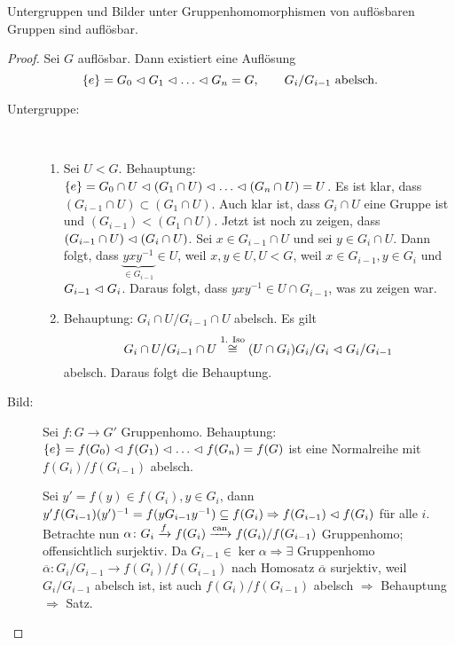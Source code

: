 \documentclass[12pt,a4paper]{scrartcl}
\begin{document}
	\begin{satz}
		Untergruppen und Bilder unter Gruppenhomomorphismen von auflösbaren Gruppen sind auflösbar.
	\end{satz}
	\begin{proof}
		Sei $G$ auflösbar. Dann existiert eine Auflösung 
		\begin{equation*}
			\left\lbrace e\right\rbrace = G_0 \vartriangleleft G_1 \vartriangleleft \ldots \vartriangleleft G_n = G, \qquad  G_i/G_{i-1} \text{ abelsch.}
		\end{equation*}
		\begin{description}
			\item[Untergruppe:]~
				\begin{enumerate}
					\item Sei $U < G$. Behauptung: $\left\lbrace e\right\rbrace = G_0 \cap U \vartriangleleft (G_1 \cap U) \vartriangleleft \ldots \vartriangleleft (G_n \cap U) = U $. Es ist klar, dass $(G_{i-1} \cap U) \subset (G_1 \cap U)$. Auch klar ist, dass $G_i \cap U$ eine Gruppe ist und $(G_{i-1} ) < (G_1 \cap U)$. Jetzt ist noch zu zeigen, dass $(G_{i-1} \cap U) \vartriangleleft (G_i \cap U)$. Sei $x \in G_{i-1} \cap U$ und sei $y \in G_i \cap U$. Dann folgt, dass $\underbrace{yxy^{-1}}_{\in G_{i-1}} \in U$, weil $x, y \in U, U < G$, weil $x \in G_{i-1}, y \in G_i$ und $G_{i-1} \vartriangleleft G_i$. Daraus folgt, dass $yxy^{-1} \in U \cap G_{i-1}$, was zu zeigen war.
					\item Behauptung: $G_i \cap U / G_{i-1} \cap U$ abelsch. Es gilt \[G_i \cap U / G_{i-1} \cap U \stackrel{\text{1. Iso}}{\cong} (U \cap G_i)G_i/G_i \vartriangleleft G_i/G_{i-1}\] abelsch. Daraus folgt die Behauptung.
				\end{enumerate}
			\item[Bild:]
				Sei $f\colon G\to G'$ Gruppenhomo. Behauptung: $\{e\} = f(G_0)\nt f(G_1)\nt \dots \nt f(G_n ) = f(G)$ ist eine Normalreihe mit $f(G_i)/f(G_{i-1})$ abelsch.
				
				Sei $y' = f(y)\in f(G_i), y\in G_i$, dann $y'f(G_{i-1})(y')^{-1} = f(yG_{i-1}y^{-1})\subseteq f(G_i)\Rightarrow f(G_{i-1})\vartriangleleft f(G_i)$ für alle $i$. Betrachte nun $\alpha\colon G_i\xrightarrow{f} f(G_i)\xrightarrow{\text{can}}f(G_i)/f(G_{i-1})$ Gruppenhomo; offensichtlich surjektiv. Da $G_{i-1}\in \ker \alpha\Rightarrow \exists$ Gruppenhomo $\overline{\alpha}\colon G_i/G_{i-1}\to f(G_i)/f(G_{i-1})$ nach Homosatz $\overline{\alpha}$ surjektiv, weil $G_i/G_{i-1}$ abelsch ist, ist auch $f(G_i)/f(G_{i-1})$ abelsch $\Rightarrow$ Behauptung $\Rightarrow$ Satz.
		\end{description}
\end{proof}
\end{document}
